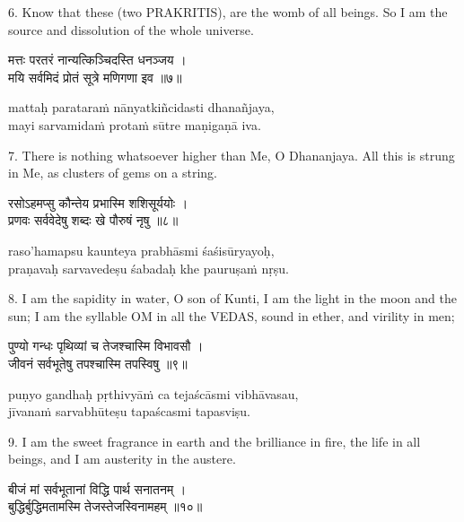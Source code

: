 6. Know that these (two PRAKRITIS), are the womb of all beings. So I am the
source and dissolution of the whole universe.

\begin{gitaverse}
मत्तः परतरं नान्यत्किञ्चिदस्ति धनञ्जय । \\
मयि सर्वमिदं प्रोतं सूत्रे मणिगणा इव ॥७॥
\end{gitaverse}

\begin{transliteration}
mattaḥ parataraṁ nānyatkiñcidasti dhanañjaya, \\
mayi sarvamidaṁ protaṁ sūtre maṇigaṇā iva.
\end{transliteration}

7. There is nothing whatsoever higher than Me, O Dhananjaya. All this is strung
in Me, as clusters of gems on a string.

\begin{gitaverse}
रसोऽहमप्सु कौन्तेय प्रभास्मि शशिसूर्ययोः । \\
प्रणवः सर्ववेदेषु शब्दः खे पौरुषं नृषु ॥८॥
\end{gitaverse}

\begin{transliteration}
raso'hamapsu kaunteya prabhāsmi śaśisūryayoḥ, \\
praṇavaḥ sarvavedeṣu śabadaḥ khe pauruṣaṁ nṛṣu.
\end{transliteration}

8. I am the sapidity in water, O son of Kunti, I am the light in the moon and
the sun; I am the syllable OM in all the VEDAS, sound in ether, and virility in
men;

\begin{gitaverse}
पुण्यो गन्धः पृथिव्यां च तेजश्चास्मि विभावसौ । \\
जीवनं सर्वभूतेषु तपश्चास्मि तपस्विषु ॥९॥
\end{gitaverse}

\begin{transliteration}
puṇyo gandhaḥ pṛthivyāṁ ca tejaścāsmi vibhāvasau, \\
jīvanaṁ sarvabhūteṣu tapaścasmi tapasviṣu.
\end{transliteration}

9. I am the sweet fragrance in earth and the brilliance in fire, the life in
all beings, and I am austerity in the austere.

\begin{gitaverse}
बीजं मां सर्वभूतानां विद्धि पार्थ सनातनम् । \\
बुद्धिर्बुद्धिमतामस्मि तेजस्तेजस्विनामहम् ॥१०॥
\end{gitaverse}

